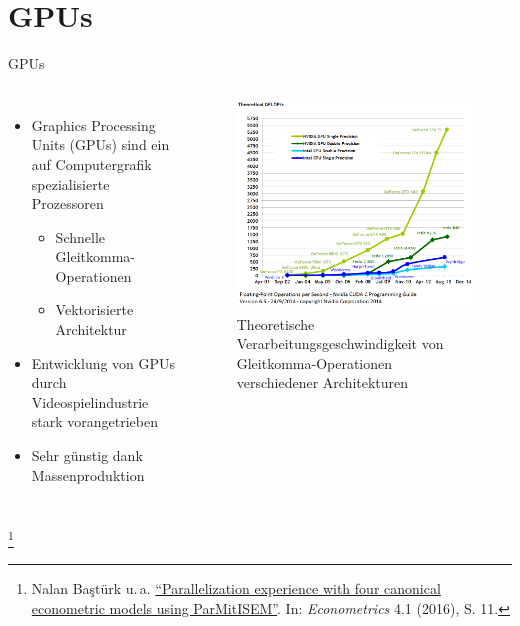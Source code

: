 \documentclass[10pt]{beamer}
\let\svthefootnote\thefootnote
\begin{document}
\section{GPUs}

\begin{frame}{GPUs}
  \begin{columns}
      \begin{itemize}
        \item Graphics Processing Units (GPUs) sind ein auf Computergrafik
              spezialisierte Prozessoren
        \begin{itemize}
          \item Schnelle Gleitkomma-Operationen
          \item Vektorisierte Architektur
        \end{itemize}
        \item Entwicklung von GPUs durch Videospielindustrie stark
              vorangetrieben
        \item Sehr günstig dank Massenproduktion
      \end{itemize}
      \begin{figure}
        \centering
        \includegraphics[width=\linewidth]{figures/fg-flops.png}
        \caption{Theoretische Verarbeitungsgeschwindigkeit von
                 Gleitkomma-Operationen verschiedener
                 Architekturen}
      \end{figure}
  \end{columns}

  \footnotesize
  \let\thefootnote\relax\footnote{Nalan Ba\c{s}t{\"u}rk u.\,a.
  \href{https://www.researchgate.net/publication/292514527_Parallelization_Experience_with_Four_Canonical_Econometric_Models_Using_ParMitISEM}{
  ``Parallelization experience with four canonical econometric models using ParMitISEM''}. In: \textit{Econometrics} 4.1 (2016), S. 11.}
  \addtocounter{footnote}{-1}\let\thefootnote\svthefootnote\relax
  \normalsize
\end{frame}
\end{document}
